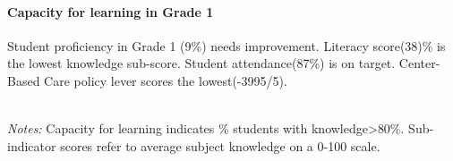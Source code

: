 \documentclass[twocolumn]{article}
\let\oldparagraph\paragraph
\renewcommand{\paragraph}[1]{\oldparagraph{#1}\mbox{}}
\begin{document}
\hypertarget{capacity-for-learning-in-grade-1}{%
\paragraph{\texorpdfstring{\textbf{Capacity for learning in Grade
1}}{Capacity for learning in Grade 1}}\label{capacity-for-learning-in-grade-1}}

Student proficiency in Grade 1 (9\%) needs improvement. Literacy
score(38)\% is the lowest knowledge sub-score. Student attendance(87\%)
is on target. Center-Based Care policy lever scores the lowest(-3995/5).

\begin{table}[H]
\\
\color{darkgray}\scriptsize{\textit{Notes:} Capacity for learning indicates \% students with knowledge\textgreater{80\%}. Sub-indicator scores refer to average subject knowledge on a 0-100 scale.}
\end{table}
\vfill\null
\end{document}
